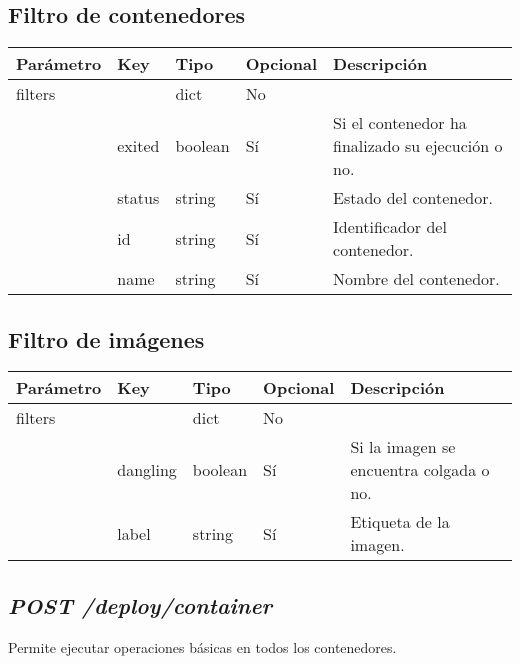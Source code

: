 	\bigskip
	
	\pagebreak
	\subsection{Filtro de contenedores}
	\label{sec:filtrocontenedor}
		\begin{table}[h!]
			\centering
	\begin{adjustbox}{max width=\textwidth}
			\begin{tabularx}{\linewidth}{|l|l|l|l|L|}
				\hline
				Parámetro & Key & Tipo & Opcional & Descripción \\ \hline
				filters &  & dict & No &  \\ \hline
				& exited & boolean & Sí & Si el contenedor ha finalizado su ejecución o no. \\ \hline
				& status & string & Sí & Estado del contenedor. \\ \hline
				& id & string & Sí & Identificador del contenedor. \\ \hline
				& name & string & Sí & Nombre del contenedor. \\ \hline
			\end{tabularx}
\end{adjustbox}
		\end{table}
	
	\subsection{Filtro de imágenes}
	\label{sec:filtroimagen}
		\begin{table}[h!]
			\centering
	\begin{adjustbox}{max width=\textwidth}
			\begin{tabularx}{\linewidth}{|l|l|l|l|L|}
				\hline
				Parámetro & Key & Tipo & Opcional & Descripción \\ \hline
				filters &  & dict & No &  \\ \hline
				& dangling & boolean & Sí & Si la imagen se encuentra colgada o no. \\ \hline
				& label & string & Sí & Etiqueta de la imagen. \\ \hline
			\end{tabularx}
\end{adjustbox}
		\end{table}
	
	
	\subsection{\textit{POST /deploy/container}}
		Permite ejecutar operaciones básicas en todos los contenedores.
		
